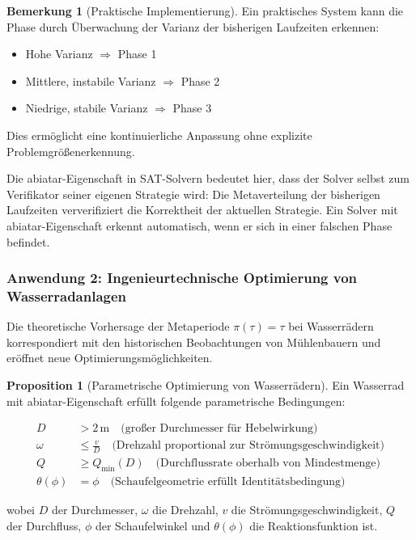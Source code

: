 \documentclass[a4paper,12pt]{article}
\theoremstyle{definition}
\newtheorem{bemerkung}{Bemerkung}
\newtheorem{proposition}{Proposition}
\begin{document}
\begin{bemerkung}[Praktische Implementierung]
Ein praktisches System kann die Phase durch Überwachung der Varianz der bisherigen Laufzeiten erkennen:
\begin{itemize}
	\item Hohe Varianz $\Rightarrow$ Phase 1
	\item Mittlere, instabile Varianz $\Rightarrow$ Phase 2  
	\item Niedrige, stabile Varianz $\Rightarrow$ Phase 3
\end{itemize}
Dies ermöglicht eine kontinuierliche Anpassung ohne explizite Problemgrößenerkennung.
\end{bemerkung}

Die abiatar-Eigenschaft in SAT-Solvern bedeutet hier, dass der Solver selbst zum Verifikator seiner eigenen Strategie wird: Die Metaverteilung der bisherigen Laufzeiten ververifiziert die Korrektheit der aktuellen Strategie. Ein Solver mit abiatar-Eigenschaft erkennt automatisch, wenn er sich in einer falschen Phase befindet.

\subsubsection{Anwendung 2: Ingenieurtechnische Optimierung von Wasserradanlagen}

Die theoretische Vorhersage der Metaperiode $\pi(\tau) = \tau$ bei Wasserrädern korrespondiert mit den historischen Beobachtungen von Mühlenbauern und eröffnet neue Optimierungsmöglichkeiten.

\begin{proposition}[Parametrische Optimierung von Wasserrädern]
Ein Wasserrad mit abiatar-Eigenschaft erfüllt folgende parametrische Bedingungen:

\begin{align}
D &> 2\,\text{m} \quad \text{(großer Durchmesser für Hebelwirkung)} \\
\omega &\leq \frac{v}{D} \quad \text{(Drehzahl proportional zur Strömungsgeschwindigkeit)} \\
Q &\geq Q_{\min}(D) \quad \text{(Durchflussrate oberhalb von Mindestmenge)} \\
\theta(\phi) &= \phi \quad \text{(Schaufelgeometrie erfüllt Identitätsbedingung)}
\end{align}

wobei $D$ der Durchmesser, $\omega$ die Drehzahl, $v$ die Strömungsgeschwindigkeit, $Q$ der Durchfluss, $\phi$ der Schaufelwinkel und $\theta(\phi)$ die Reaktionsfunktion ist.
\end{proposition}
\end{document}
